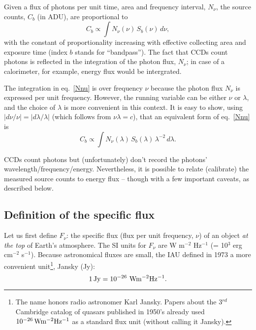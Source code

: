 \documentclass{emulateapj}
\begin{document}
Given a flux of photons per unit time, area and frequency interval, $N_\nu$, the 
source counts, $C_b$ (in ADU), are proportional to 
\begin{equation}
\label{Nnu}
        C_b \propto \int N_\nu(\nu) \, S_b(\nu) \, d\nu,
\end{equation}
with the constant of proportionality increasing with effective collecting area and exposure 
time (index $b$ stands for ``bandpass''). The fact that CCDs count photons is reflected in
the integration of the photon flux, $N_\nu$; in case of a calorimeter, for example, energy 
flux would be intergrated.
 
The integration in eq.~\ref{Nnu} is over frequency $\nu$ because the photon flux $N_\nu$ 
is expressed per unit frequency. However, the running variable can be either  $\nu$ or 
$\lambda$, and the choice of $\lambda$ is more convenient in this context. It is 
easy to show, using $|d\nu/\nu| = |d\lambda / \lambda|$ (which follows from $\nu \lambda=c$),
that an equivalent form of  eq.~\ref{Nnu} is
\begin{equation}
\label{Nnu2}
         C_b\propto \int N_\nu(\lambda) \, S_b(\lambda) \, \lambda^{-2} \, d\lambda. 
\end{equation}


CCDs count photons but (unfortunately) don't record the photons' wavelength/frequency/energy.
Nevertheless, it is possible to relate (calibrate) the measured source counts to energy flux -- though
with a few important caveats, as described below. 

 

\subsection{Definition of the specific flux} 

Let us first  define $F_\nu$: the specific flux (flux per unit frequency, $\nu$) of an 
object {\it at the top} of Earth's atmosphere. The SI units for $F_\nu$ are 
W m$^{-2}$ Hz$^{-1}$ (= 10$^{3}$ erg cm$^{-2}$ s$^{-1}$). Because astronomical 
fluxes are small, the IAU defined in 1973 a more convenient unit\footnote{The
name honors radio astronomer Karl Jansky. Papers about the 3$^{rd}$ Cambridge 
catalog of quasars published in 1950's already used $10^{-26} \, {\rm W m^{-2} Hz^{-1}}$
as a standard flux unit (without calling it Jansky).},  Jansky (Jy): 
\begin{equation}
            1 \, {\rm Jy} = 10^{-26} \,\, {\rm W m^{-2} Hz^{-1}}.
\end{equation} 
\end{document}
